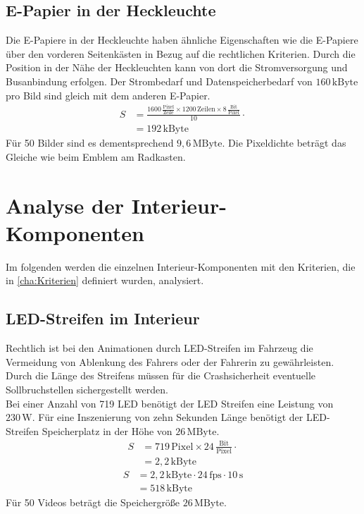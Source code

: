 \subsection{E-Papier in der Heckleuchte}
Die E-Papiere in der Heckleuchte haben ähnliche Eigenschaften wie die E-Papiere über den vorderen Seitenkästen in Bezug auf die rechtlichen Kriterien. Durch die Position in der Nähe der Heckleuchten kann von dort die Stromversorgung und Busanbindung erfolgen. Der Strombedarf und Datenspeicherbedarf von $ 160\,\mathrm{kByte} $ pro Bild sind gleich mit dem anderen E-Papier. 
\begin{align}
	S &= \frac{1600\,\frac{\mathrm{Pixel}}{\mathrm{Zeile}} \times 1200\,\mathrm{Zeilen} \times 8\,\frac{\mathrm{Bit}}{\mathrm{Pixel}}}{10} \cdot \\
	&= 192\,\mathrm{kByte}
\end{align}
Für 50 Bilder sind es dementsprechend $ 9,6\,\mathrm{MByte} $.
Die Pixeldichte beträgt das Gleiche wie beim Emblem am Radkasten.
\section{Analyse der Interieur-Komponenten}
Im folgenden werden die einzelnen Interieur-Komponenten mit den Kriterien, die in \ref{cha:Kriterien} definiert wurden, analysiert.
\subsection{LED-Streifen im Interieur}
Rechtlich ist bei den Animationen durch LED-Streifen im Fahrzeug die Vermeidung von Ablenkung des Fahrers oder der Fahrerin zu gewährleisten.
Durch die Länge des Streifens müssen für die Crashsicherheit eventuelle Sollbruchstellen sichergestellt werden. \\
Bei einer Anzahl von 719 LED benötigt der LED Streifen eine Leistung von $ 230\,\mathrm{W} $.
Für eine Inszenierung von zehn Sekunden Länge benötigt der LED-Streifen Speicherplatz in der Höhe von $ 26\,\mathrm{MByte}$.
\begin{align}
	S &= 719\,\mathrm{Pixel} \times 24\,\frac{\mathrm{Bit}}{\mathrm{Pixel}} \cdot \\
	&= 2,2\,\mathrm{kByte}
\end{align}
\begin{align}
	S &= 2,2\,\mathrm{kByte} \cdot 24\,\mathrm{fps} \cdot 10\,\mathrm{s}\\
	&= 518\,\mathrm{kByte}
\end{align}
Für 50 Videos beträgt die Speichergröße $ 26\,\mathrm{MByte} $.
